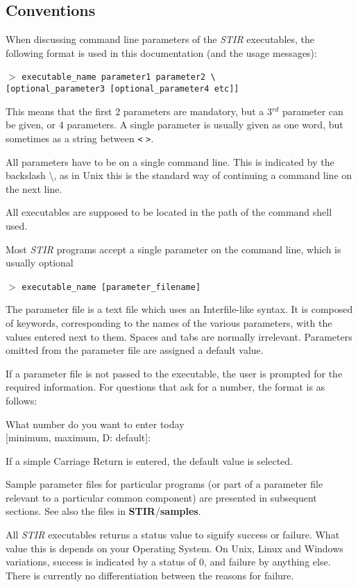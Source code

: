 \documentclass{article}
\newcommand{\tab}{\hspace{5mm}}
\newcommand{\cmdline}[1]{\par \noindent $>$ \texttt{#1}\par}
\begin{document}
\subsection{
Conventions}
\label{sec:conventions}
When discussing command line parameters of the \textit{STIR} executables, 
the following format is used in this documentation (and the usage messages):
\cmdline{executable\_name parameter1 parameter2 {\textbackslash}\\
{[}optional\_parameter3 [optional\_parameter4 etc]]}


This means that the first 2 parameters are mandatory, but a 3$^{rd}$ 
parameter can be given, or 4 parameters. A single parameter is 
usually given as one word, but sometimes as a string between 
\texttt{<} \texttt{>}. 


All parameters have to be on a single command line. This is indicated 
by the backslash {\textbackslash}, as in Unix this is the standard way 
of continuing a command line on the next line.


All executables are supposed to be located in the path of the 
command shell used.


Most \textit{STIR} programs accept a single parameter on the command 
line, which is usually optional

\cmdline{executable\_name [parameter\_filename]}


The parameter file is a text file which uses an Interfile-like 
syntax. It is composed of keywords, corresponding to the names 
of the various parameters, with the values entered next to them. 
Spaces and tabs are normally irrelevant. Parameters omitted from 
the parameter file are assigned a default value. 


If a parameter file is not passed to the executable, the user 
is prompted for the required information. For questions that 
ask for a number, the format is as follows:


\tab What number do you want to enter today \\
\tab [minimum, maximum, D: default]:


If a simple Carriage Return is entered, the default value is 
selected.


Sample parameter files for particular programs (or part of a 
parameter file relevant to a particular common component) are 
presented in subsequent sections. See also the files in \textbf{STIR}/\textbf{samples}.



All \textit{STIR} executables returns a status value to signify success 
or failure. What value this is depends on your Operating System. 
On Unix, Linux and Windows variations, success is indicated by 
a status of 0, and failure by anything else. There is currently 
no differentiation between the reasons for failure.
\end{document}
